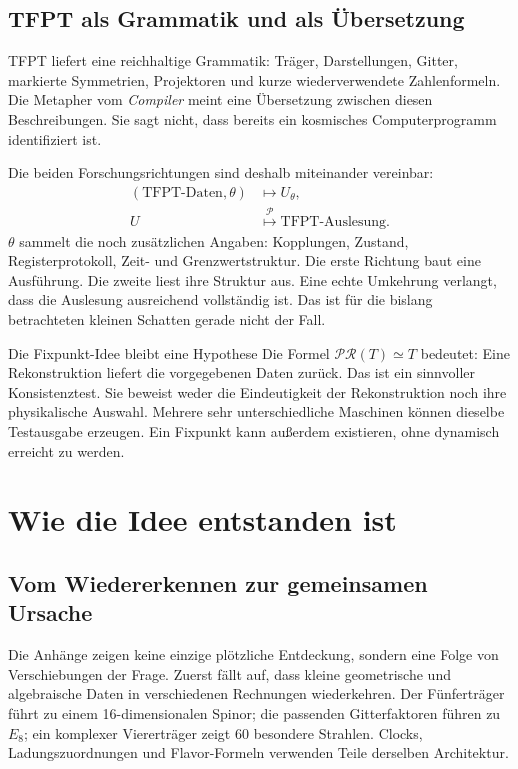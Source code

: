 \section{TFPT als Grammatik und als Übersetzung}
TFPT liefert eine reichhaltige Grammatik: Träger, Darstellungen, Gitter, markierte Symmetrien, Projektoren und kurze wiederverwendete Zahlenformeln. Die Metapher vom \emph{Compiler} meint eine Übersetzung zwischen diesen Beschreibungen. Sie sagt nicht, dass bereits ein kosmisches Computerprogramm identifiziert ist.

Die beiden Forschungsrichtungen sind deshalb miteinander vereinbar:
\begin{align}
(\text{TFPT-Daten},\theta)&\longmapsto U_{\theta},\label{eq:vorwaerts}\\
U&\overset{\mathcal P}{\longmapsto}\text{TFPT-Auslesung}.
\end{align}
$\theta$ sammelt die noch zusätzlichen Angaben: Kopplungen, Zustand, Registerprotokoll, Zeit- und Grenzwertstruktur. Die erste Richtung baut eine Ausführung. Die zweite liest ihre Struktur aus. Eine echte Umkehrung verlangt, dass die Auslesung ausreichend vollständig ist. Das ist für die bislang betrachteten kleinen Schatten gerade nicht der Fall.

\begin{grenze}{Die Fixpunkt-Idee bleibt eine Hypothese}
Die Formel $\mathcal P\mathcal R(T)\simeq T$ bedeutet: Eine Rekonstruktion liefert die vorgegebenen Daten zurück. Das ist ein sinnvoller Konsistenztest. Sie beweist weder die Eindeutigkeit der Rekonstruktion noch ihre physikalische Auswahl. Mehrere sehr unterschiedliche Maschinen können dieselbe Testausgabe erzeugen. Ein Fixpunkt kann außerdem existieren, ohne dynamisch erreicht zu werden.
\end{grenze}

\chapter{Wie die Idee entstanden ist}
\section{Vom Wiedererkennen zur gemeinsamen Ursache}
Die Anhänge zeigen keine einzige plötzliche Entdeckung, sondern eine Folge von Verschiebungen der Frage. Zuerst fällt auf, dass kleine geometrische und algebraische Daten in verschiedenen Rechnungen wiederkehren. Der Fünferträger führt zu einem 16-dimensionalen Spinor; die passenden Gitterfaktoren führen zu $E_8$; ein komplexer Viererträger zeigt 60 besondere Strahlen. Clocks, Ladungszuordnungen und Flavor-Formeln verwenden Teile derselben Architektur.

